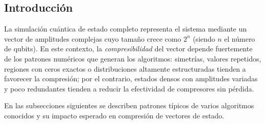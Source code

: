 \subsection{Introducción}
\label{subsec:patrones_intro}

La simulación cuántica de estado completo representa el sistema mediante un vector de amplitudes complejas cuyo tamaño crece como $2^n$ (siendo $n$ el número de qubits). En este contexto, la \textit{compresibilidad} del vector depende fuertemente de los patrones numéricos que generan los algoritmos: simetrías, valores repetidos, regiones con ceros exactos o distribuciones altamente estructuradas tienden a favorecer la compresión; por el contrario, estados densos con amplitudes variadas y poco redundantes tienden a reducir la efectividad de compresores sin pérdida.

En las subsecciones siguientes se describen patrones típicos de varios algoritmos conocidos y su impacto esperado en compresión de vectores de estado.
